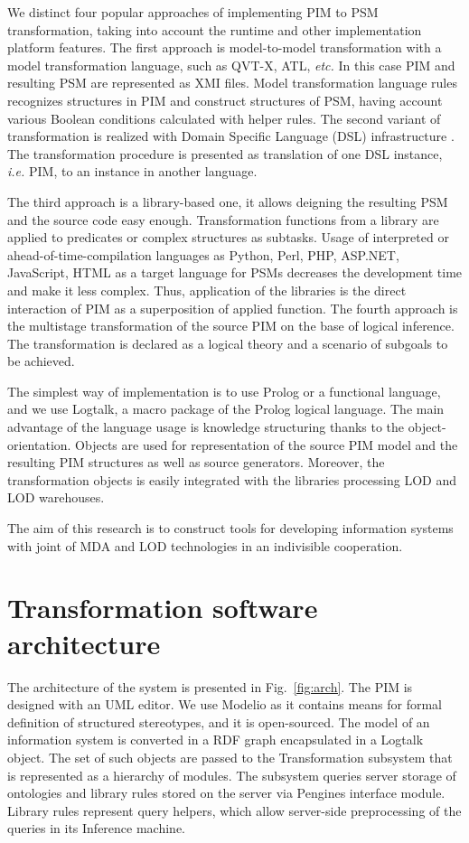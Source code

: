 \documentclass[conference,a4paper]{IEEEtran}
\begin{document}
We distinct four popular approaches of implementing PIM to PSM transformation, taking into account the runtime and other implementation platform features.  The first approach is model-to-model transformation with a model transformation language, such as QVT-X, ATL, \emph{etc.}  In this case PIM and resulting PSM are represented as XMI files.  Model transformation language rules recognizes structures in PIM and construct structures of PSM, having account various Boolean conditions calculated with helper rules. The second variant of transformation is realized with Domain Specific Language (DSL) infrastructure \cite{stratego}.  The transformation procedure is presented as translation of one DSL instance, \emph{i.e.} PIM, to an instance in another language.

The third approach is a library-based one, it allows deigning the resulting PSM and the source code easy enough.  Transformation functions from a library are applied to predicates or complex structures as subtasks. Usage of interpreted or ahead-of-time-compilation languages as Python, Perl, PHP, ASP.NET, JavaScript, HTML as a target language for PSMs decreases the development time and make it less complex.  Thus, application of the libraries is the direct interaction of PIM as a superposition of applied function.  The fourth approach is the multistage transformation of the source PIM \cite{tereh1} on the base of logical inference.  The transformation is declared as a logical theory and a scenario of subgoals to be achieved.

The simplest way of implementation is to use Prolog or a functional language, and we use Logtalk, a macro package of the Prolog logical language.  The main advantage of the language usage is knowledge structuring thanks to the object-orientation.  Objects are used for representation of the source PIM model and the resulting PIM structures as well as source generators.  Moreover, the transformation objects is easily integrated with the libraries processing LOD and LOD warehouses.

The aim of this research is to construct tools for developing information systems with joint of MDA and LOD technologies in an indivisible cooperation.


\section{Transformation software architecture}
\label{sec:arch}

The architecture of the system is presented in Fig.~\ref{fig:arch}.  The PIM is designed with an UML editor.  We use Modelio \cite{modelio} as it contains means for formal definition of structured stereotypes, and it is open-sourced.  The model of an information system is converted in a RDF graph encapsulated in a Logtalk object.  The set of such objects are passed to the Transformation subsystem that is represented as a hierarchy of modules.  The subsystem queries server storage of ontologies and library rules stored on the server via Pengines interface module.  Library rules represent query helpers, which allow server-side preprocessing of the queries in its Inference machine.
\end{document}
